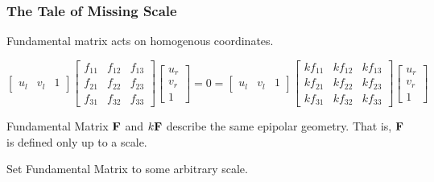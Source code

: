 \begin{frame}
    \frametitle{The Tale of Missing Scale}
    
    Fundamental matrix acts on homogenous coordinates.

    \begin{equation*}
    \begin{bmatrix} u_l & v_l & 1 \end{bmatrix}
    \begin{bmatrix}
        f_{11} & f_{12} & f_{13} \\
        f_{21} & f_{22} & f_{23} \\
        f_{31} & f_{32} & f_{33}
    \end{bmatrix}
    \begin{bmatrix} u_r \\ v_r \\ 1 \end{bmatrix}
    = 0
    =
    \begin{bmatrix} u_l & v_l & 1 \end{bmatrix}
    \begin{bmatrix}
        kf_{11} & kf_{12} & kf_{13} \\
        kf_{21} & kf_{22} & kf_{23} \\
        kf_{31} & kf_{32} & kf_{33} \end{bmatrix}
    \begin{bmatrix} u_r \\ v_r \\ 1 \end{bmatrix}
    \end{equation*}

    Fundamental Matrix $\boldsymbol{\mathbf{F}}$ and $k\boldsymbol{\mathbf{F}}$ describe the same epipolar geometry. That is, $\boldsymbol{\mathbf{F}}$ is defined only up to a scale.

    Set Fundamental Matrix to some arbitrary scale.

    \begin{center}
    \end{center}
    
\end{frame}

